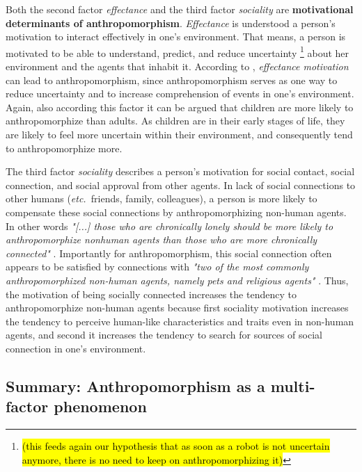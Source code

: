 \documentclass{frontiersSCNS} %
\newcommand{\etc}{{\textit{etc.~}}}
\begin{document}
Both the second factor \textit{effectance} and the third factor \textit{sociality} are \textbf{motivational determinants of anthropomorphism}. \textit{Effectance} is understood a person's motivation to interact effectively in one's environment. That means, a person is motivated to be able to understand, predict, and reduce uncertainty \footnote{\hl{(this feeds again our hypothesis that as soon as a robot is not uncertain anymore, there is no need to keep on anthropomorphizing it)}} about her environment and the agents that inhabit it. According to \cite{epley_seeing_2007}, \textit{effectance motivation} can lead to anthropomorphism, since anthropomorphism serves as one way to reduce uncertainty and to increase comprehension of events in one's environment. Again, also according this factor it can be argued that children are more likely to anthropomorphize than adults. As children are in their early stages of life, they are likely to feel more uncertain within their environment, and consequently tend to anthropomorphize more.

The third factor \textit{sociality} describes a person's motivation for social contact, social connection, and social approval from other agents. In lack of social connections to other humans (\etc friends, family, colleagues), a person is more likely to compensate these social connections by anthropomorphizing non-human agents. In other words \textit{"[...] those who are chronically lonely should be more likely to anthropomorphize nonhuman agents than those who are more chronically connected"} \citep{epley_seeing_2007}. Importantly for anthropomorphism, this social connection often appears to be satisfied by connections with \textit{"two of the most commonly anthropomorphized non-human agents, namely pets and religious agents"} \citep{epley_seeing_2007}. Thus, the motivation of being socially connected increases the tendency to anthropomorphize non-human agents because first sociality motivation increases the tendency to perceive human-like characteristics and traits even in non-human agents, and second it increases the tendency to search for sources of social connection in one's environment.

  



\subsection{Summary: Anthropomorphism as a multi-factor phenomenon}
\label{sec:multi-factors}
\end{document}
